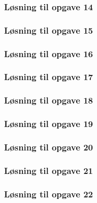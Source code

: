 \subsubsection*{Løsning til opgave 14}

\subsubsection*{Løsning til opgave 15}

\subsubsection*{Løsning til opgave 16}

\subsubsection*{Løsning til opgave 17}

\subsubsection*{Løsning til opgave 18}

\subsubsection*{Løsning til opgave 19}

\subsubsection*{Løsning til opgave 20}

\subsubsection*{Løsning til opgave 21}

\subsubsection*{Løsning til opgave 22}

